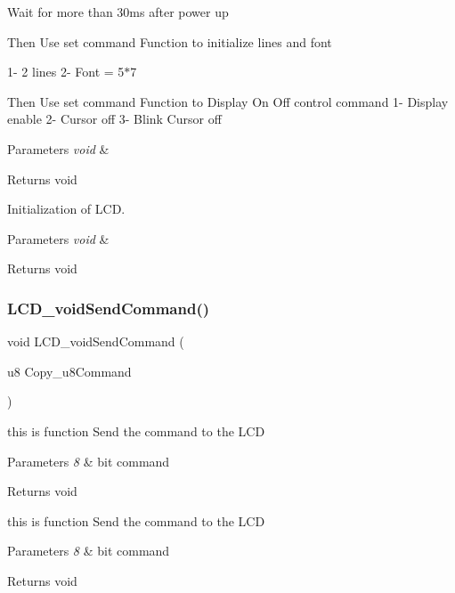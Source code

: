 Wait for more than 30ms after power up

Then Use set command Function to initialize lines and font

1-\/ 2 lines 2-\/ Font = 5$\ast$7

Then Use set command Function to Display On Off control command 1-\/ Display enable 2-\/ Cursor off 3-\/ Blink Cursor off


\begin{DoxyParams}{Parameters}
{\em void} & \\
\hline
\end{DoxyParams}
\begin{DoxyReturn}{Returns}
void
\end{DoxyReturn}
Initialization of L\+CD.


\begin{DoxyParams}{Parameters}
{\em void} & \\
\hline
\end{DoxyParams}
\begin{DoxyReturn}{Returns}
void 
\end{DoxyReturn}
\mbox{\label{_l_c_d__interface_8h_a8e2918471a3b4ad25ffd14a814e08c9e}} 
\subsubsection{LCD\_voidSendCommand()}
{\footnotesize\ttfamily void L\+C\+D\+\_\+void\+Send\+Command (\begin{DoxyParamCaption}\item[{u8}]{Copy\+\_\+u8\+Command }\end{DoxyParamCaption})}



this is function Send the command to the L\+CD 


\begin{DoxyParams}{Parameters}
{\em 8} & bit command\\
\hline
\end{DoxyParams}
\begin{DoxyReturn}{Returns}
void
\end{DoxyReturn}
this is function Send the command to the L\+CD


\begin{DoxyParams}{Parameters}
{\em 8} & bit command\\
\hline
\end{DoxyParams}
\begin{DoxyReturn}{Returns}
void 
\end{DoxyReturn}
\mbox{\label{_l_c_d__interface_8h_a6e31083c0cb3e71bcb1a5b4a3986a7f1}} 
